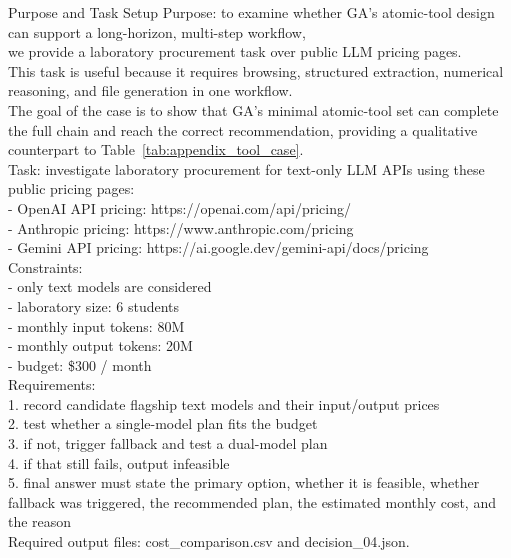 \begin{CasePromptBox}{Purpose and Task Setup}
\small\ttfamily
Purpose: to examine whether GA's atomic-tool design can support a long-horizon, multi-step workflow, \\
we provide a laboratory procurement task over public LLM pricing pages. \\
This task is useful because it requires browsing, structured extraction, numerical reasoning, and file generation in one workflow. \\
The goal of the case is to show that GA's minimal atomic-tool set can complete the full chain and reach the correct recommendation, providing a qualitative counterpart to Table~\ref{tab:appendix_tool_case}. \\
Task: investigate laboratory procurement for text-only LLM APIs using these public pricing pages: \\
- OpenAI API pricing: https://openai.com/api/pricing/ \\
- Anthropic pricing: https://www.anthropic.com/pricing \\
- Gemini API pricing: https://ai.google.dev/gemini-api/docs/pricing \\
Constraints: \\
- only text models are considered \\
- laboratory size: 6 students \\
- monthly input tokens: 80M \\
- monthly output tokens: 20M \\
- budget: \$300 / month \\
Requirements: \\
1. record candidate flagship text models and their input/output prices \\
2. test whether a single-model plan fits the budget \\
3. if not, trigger fallback and test a dual-model plan \\
4. if that still fails, output infeasible \\
5. final answer must state the primary option, whether it is feasible, whether fallback was triggered, the recommended plan, the estimated monthly cost, and the reason \\
Required output files: cost\_comparison.csv and decision\_04.json.
\end{CasePromptBox}

